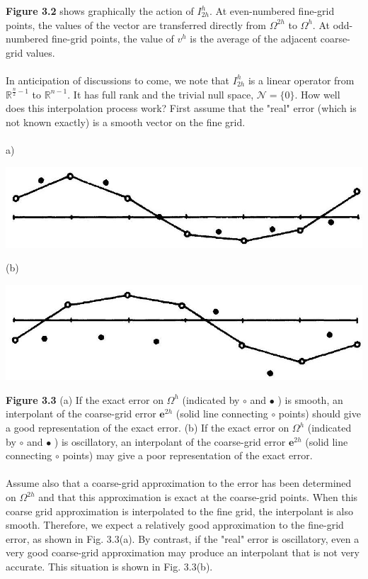 \documentclass[11pt]{book}
\begin{document}
\textbf{Figure 3.2} shows graphically the action of $I_{2 h}^{h}$. At even-numbered fine-grid points, the values of the vector are transferred directly from $\Omega^{2 h}$ to $\Omega^{h}$. At odd-numbered fine-grid points, the value of $v^{h}$ is the average of the adjacent coarse-grid values.\\ \\
In anticipation of discussions to come, we note that $I_{2 h}^{h}$ is a linear operator from $\mathbb{R}^{\frac{n}{2}-1}$ to $\mathbb{R}^{n-1}$. It has full rank and the trivial null space, $\mathcal{N}=\{0\}$.
How well does this interpolation process work? First assume that the "real" error (which is not known exactly) is a smooth vector on the fine grid.\\ \\
a)
\begin{center}
\includegraphics[max width=\textwidth]{2023_10_10_f3de0b9400b097aecf14g-048}
\end{center}
(b)
\begin{center}
\includegraphics[max width=\textwidth]{2023_10_10_f3de0b9400b097aecf14g-048(1)}
\end{center}
\textbf{Figure 3.3} (a) If the exact error on $\Omega^h$ (indicated by $\circ$ and $\bullet$ ) is smooth, an interpolant of the coarse-grid error $\mathbf{e}^{2 h}$ (solid line connecting $\circ$ points) should give a good representation of the exact error. (b) If the exact error on $\Omega^h$ (indicated by $\circ$ and $\bullet$ ) is oscillatory, an interpolant of the coarse-grid error $\mathbf{e}^{2 h}$ (solid line connecting $\circ$ points) may give a poor representation of the exact error.\\ \\
Assume also that a coarse-grid approximation to the error has been determined on $\Omega^{2 h}$ and that this approximation is exact at the coarse-grid points. When this coarse grid approximation is interpolated to the fine grid, the interpolant is also smooth. Therefore, we expect a relatively good approximation to the fine-grid error, as shown in Fig. 3.3(a). By contrast, if the "real" error is oscillatory, even a very good coarse-grid approximation may produce an interpolant that is not very accurate. This situation is shown in Fig. 3.3(b). \\ \\
\end{document}

